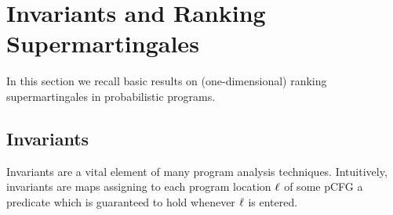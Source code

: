 \section{Invariants and Ranking Supermartingales}\label{sec:invm}

In this section we recall basic results on (one-dimensional) ranking 
supermartingales in probabilistic programs.



\subsection{Invariants}

Invariants are a vital element of many program analysis techniques. 
Intuitively, invariants are maps assigning to each 
program location $\ell$ of some pCFG a predicate which is guaranteed to hold 
whenever $\ell$ is 
entered. 

